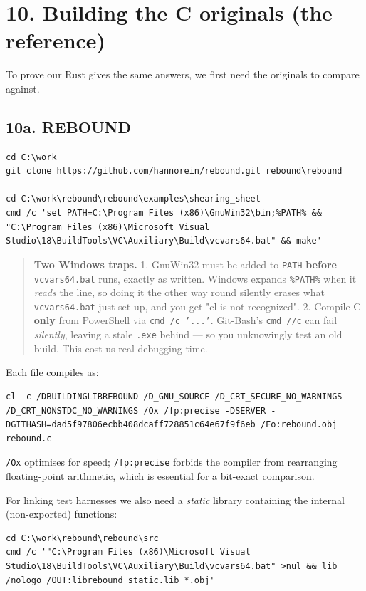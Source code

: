\documentclass[11pt]{article}
\begin{document}
\section{10. Building the C originals (the reference)}

To prove our Rust gives the same answers, we first need the originals to compare against.

\subsection{10a. REBOUND}

\begin{lstlisting}
cd C:\work
git clone https://github.com/hannorein/rebound.git rebound\rebound

cd C:\work\rebound\rebound\examples\shearing_sheet
cmd /c 'set PATH=C:\Program Files (x86)\GnuWin32\bin;%PATH% && "C:\Program Files (x86)\Microsoft Visual Studio\18\BuildTools\VC\Auxiliary\Build\vcvars64.bat" && make'
\end{lstlisting}

\begin{quote}
\textbf{Two Windows traps.} 1. GnuWin32 must be added to \texttt{PATH} \textbf{before} \texttt{vcvars64.bat} runs, exactly as written. Windows expands \texttt{\%PATH\%} when it \emph{reads} the line, so doing it the other way round silently erases what \texttt{vcvars64.bat} just set up, and you get "cl is not recognized". 2. Compile C \textbf{only} from PowerShell via \texttt{cmd /c '...'}. Git-Bash's \texttt{cmd //c} can fail \emph{silently}, leaving a stale \texttt{.exe} behind --- so you unknowingly test an old build. This cost us real debugging time.
\end{quote}

Each file compiles as:

\begin{lstlisting}
cl -c /DBUILDINGLIBREBOUND /D_GNU_SOURCE /D_CRT_SECURE_NO_WARNINGS /D_CRT_NONSTDC_NO_WARNINGS /Ox /fp:precise -DSERVER -DGITHASH=dad5f97806ecbb408dcaff728851c64e67f9f6eb /Fo:rebound.obj rebound.c
\end{lstlisting}

\texttt{/Ox} optimises for speed; \texttt{/fp:precise} forbids the compiler from rearranging floating-point arithmetic, which is essential for a bit-exact comparison.

For linking test harnesses we also need a \emph{static} library containing the internal (non-exported) functions:

\begin{lstlisting}
cd C:\work\rebound\rebound\src
cmd /c '"C:\Program Files (x86)\Microsoft Visual Studio\18\BuildTools\VC\Auxiliary\Build\vcvars64.bat" >nul && lib /nologo /OUT:librebound_static.lib *.obj'
\end{lstlisting}
\end{document}
